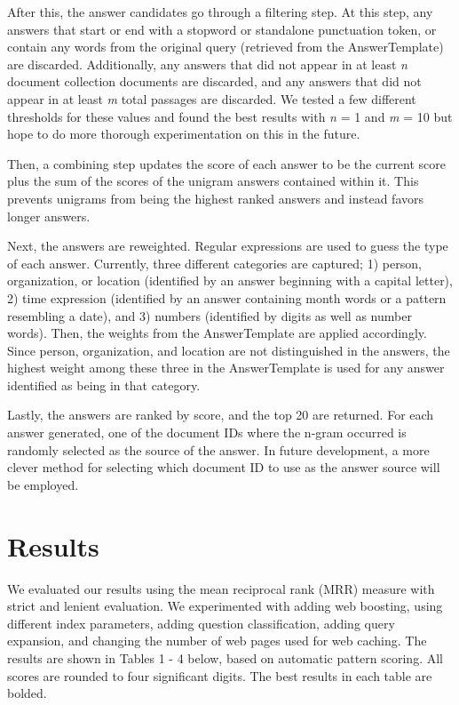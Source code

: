 \documentclass[11pt]{article}
\begin{document}
After this, the answer candidates go through a filtering step.  At this step, any answers that start or end with a stopword or standalone punctuation token, or contain any words from the original query (retrieved from the AnswerTemplate) are discarded.  Additionally, any answers that did not appear in at least \emph{n} document collection documents are discarded, and any answers that did not appear in at least \emph{m} total passages are discarded.  We tested a few different thresholds for these values and found the best results with \emph{n} = 1 and \emph{m} = 10 but hope to do more thorough experimentation on this in the future.

Then, a combining step updates the score of each answer to be the current score plus the sum of the scores of the unigram answers contained within it. This prevents unigrams from being the highest ranked answers and instead favors longer answers.

Next, the answers are reweighted.  Regular expressions are used to guess the type of each answer.  Currently, three different categories are captured; 1) person, organization, or location (identified by an answer beginning with a capital letter), 2) time expression (identified by an answer containing month words or a pattern resembling a date), and 3) numbers (identified by digits as well as number words).  Then, the weights from the AnswerTemplate are applied accordingly.  Since person, organization, and location are not distinguished in the answers, the highest weight among these three in the AnswerTemplate is used for any answer identified as being in that category.

Lastly, the answers are ranked by score, and the top 20 are returned.  For each answer generated, one of the document IDs where the n-gram occurred is randomly selected as the source of the answer.  In future development, a more clever method for selecting which document ID to use as the answer source will be employed.

\section{Results}

We evaluated our results using the mean reciprocal rank (MRR) measure with strict and lenient evaluation. We experimented with adding web boosting, using different index parameters, adding question classification, adding query expansion, and changing the number of web pages used for web caching.  The results are shown in Tables 1 - 4 below, based on automatic pattern scoring.  All scores are rounded to four significant digits.  The best results in each table are bolded.
\end{document}
